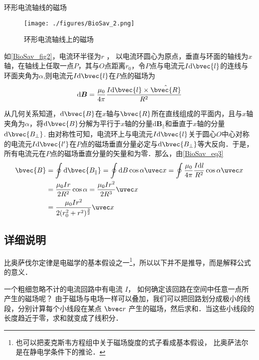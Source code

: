 \begin{example}{环形电流轴线的磁场}\label{BioSav_ex2}
\begin{figure}[ht]
\centering
\texttt{[image: ./figures/BioSav\_2.png]}
\caption{环形电流轴线上的磁场} \label{BioSav_fig2}
\end{figure}
如\autoref{BioSav_fig2}，电流环半径为$r$ ， 以电流环圆心为原点，垂直与环面的轴线为$x$轴，在轴线上任取一点$P$，其与$O$点距离$r_0$，令$P$点与电流元$I\mathrm{d}\bvec{l}$的连线与环面夹角为$\alpha$,则电流元$I\mathrm{d}\bvec{l}$在$P$点的磁场为
\begin{equation}
\mathrm{d}\boldsymbol{B}=\frac{\mu_0}{4\pi}\frac{I\mathrm{d}\bvec{l}\times\hat{\bvec{R}}}{R^2}
\end{equation}

从几何关系知道，$\mathrm{d}\bvec{B}$在$x$轴与$\bvec{R}$所在直线组成的平面内，且与$x$轴夹角为$\alpha$，将$\mathrm{d}\bvec{B}$分解为平行于$x$轴的分量$\mathrm{d}\boldsymbol{B_\parallel}$和垂直于$x$轴的分量$\mathrm{d}\bvec{B_\bot}$. 由对称性可知，电流环上与电流元$I\mathrm{d}\bvec{l}$关于圆心$O$中心对称的电流元$I\mathrm{d}\bvec{l'}$在$P$点的磁场垂直分量必定与$\mathrm{d}\bvec{B_\bot}$等大反向．于是，所有电流元在$P$点的磁场垂直分量的矢量和为零．那么，由\autoref{BioSav_eq3} 
\begin{equation}
\begin{aligned}
\bvec{B}&=\oint{\mathrm{d}\bvec{B_\parallel}}=\oint\mathrm{d}B\cos{\alpha}\uvec x=\oint\frac{\mu_0}{4\pi}\frac{I\mathrm{d}l}{R^2}\cos\alpha\uvec x\\
&=\frac{\mu_0Ir}{2R^2}\cos\alpha=\frac{\mu_0Ir^2}{2R^3}\uvec x\\
&=\frac{\mu_0Ir^2}{2(r_0^2+r^2)^{\frac{3}{2}}}\uvec x
\end{aligned}
\end{equation}
\end{example}

\subsection{详细说明}
比奥萨伐尔定律是电磁学的基本假设之一\footnote{也可以把麦克斯韦方程组中关于磁场旋度的式子看成基本假设， 比奥萨法尔是在静电学条件下的推论．}，所以以下并不是推导，而是解释公式的意义．

一个粗细忽略不计的电流回路中有电流 $I$， 如何确定该回路在空间中任意一点所产生的磁场呢？ 由于磁场与电场一样可以叠加，我们可以把回路划分成极小的线段，分别计算每个小线段在某点 $\bvec r$ 产生的磁场，然后求和．当这些小线段的长度趋近于零，求和就变成了线积分．

